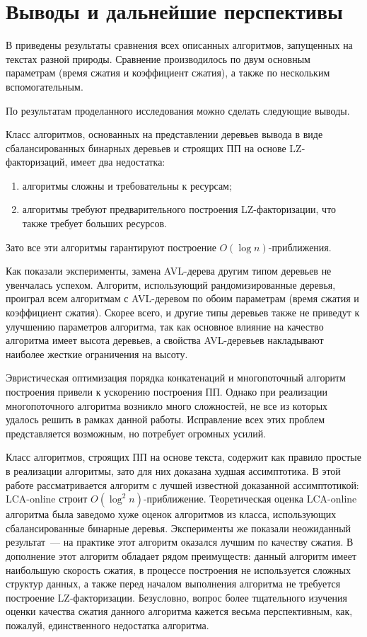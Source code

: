 \documentclass[14pt]{article}
\begin{document}
\section{Выводы и дальнейшие перспективы}

В \cite{MasterPaper} приведены результаты сравнения всех описанных алгоритмов, запущенных на текстах разной природы.
Сравнение производилось по двум основным параметрам (время сжатия и коэффициент сжатия), а также по нескольким вспомогательным.

По результатам проделанного исследования можно сделать следующие выводы.

Класс алгоритмов, основанных на представлении деревьев вывода в виде сбалансированных бинарных деревьев
и строящих ПП на основе LZ-факторизаций, имеет два недостатка: 
\begin{enumerate}
	\item алгоритмы сложны и требовательны к ресурсам;
	\item алгоритмы требуют предварительного построения LZ-факторизации, что также требует больших ресурсов.
\end{enumerate}
Зато все эти алгоритмы гарантируют построение $O(\log n)$-приближения.

Как показали эксперименты, замена AVL-дерева другим типом деревьев не увенчалась успехом. Алгоритм, использующий рандомизированные
деревья, проиграл всем алгоритмам с AVL-деревом по обоим параметрам (время сжатия и коэффициент сжатия). Скорее всего, и другие типы
деревьев также не приведут к улучшению параметров алгоритма, так как основное влияние на качество алгоритма имеет высота деревьев,
а свойства AVL-деревьев накладывают наиболее жесткие ограничения на высоту.

Эвристическая оптимизация порядка конкатенаций и многопоточный алгоритм построения привели к ускорению построения ПП.
Однако при реализации многопоточного алгоритма возникло много сложностей, не все из которых удалось решить в рамках данной работы.
Исправление всех этих проблем представляется возможным, но потребует огромных усилий.

Класс алгоритмов, строящих ПП на основе текста, содержит как правило простые в реализации алгоритмы,
зато для них доказана худшая ассимптотика. В этой работе рассматривается алгоритм с лучшей известной доказанной ассимптотикой:
LCA-online строит $O(\log^2 n)$-приближение.
Теоретическая оценка LCA-online алгоритма была заведомо хуже оценок алгоритмов из класса, использующих
сбалансированные бинарные деревья. Эксперименты же показали неожиданный результат~--- на практике этот алгоритм 
оказался лучшим по качеству сжатия. В дополнение этот алгоритм обладает рядом преимуществ: данный алгоритм имеет
наибольшую скорость сжатия, в процессе построения не используется сложных структур данных, а также перед началом
выполнения алгоритма не требуется построение LZ-факторизации. Безусловно, вопрос более тщательного изучения оценки
качества сжатия данного алгоритма кажется весьма перспективным, как, пожалуй, единственного недостатка алгоритма.
\end{document}
